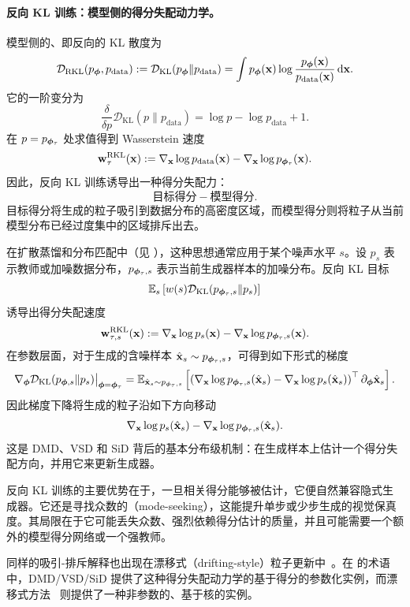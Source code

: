 \paragraph{反向 KL 训练：模型侧的得分失配动力学。}
模型侧的、即反向的 KL 散度为
\[
    \mathcal{D}_{\mathrm{RKL}}(p_{{\bm{\phi}}},p_{\mathrm{data}})
    :=
    \mathcal D_{\mathrm{KL}}(p_{{\bm{\phi}}}\|p_{\mathrm{data}})
    =
    \int
    p_{{\bm{\phi}}}({\mathbf{x}})
    \log
    \frac{p_{{\bm{\phi}}}({\mathbf{x}})}
         {p_{\mathrm{data}}({\mathbf{x}})}
    \mathop{}\!\mathrm{d}{\mathbf{x}}.
\]
它的一阶变分为
\[
    \frac{\delta}{\delta p}
    \mathcal D_{\mathrm{KL}}(p\|p_{\mathrm{data}})
    =
    \log p-\log p_{\mathrm{data}}+1.
\]
在 $p=p_{{\bm{\phi}}_\tau}$ 处求值得到 Wasserstein 速度
\[
    {\mathbf{w}}_\tau^{\mathrm{RKL}}({\mathbf{x}})
    :=
    \nabla_{{\mathbf{x}}}\log p_{\mathrm{data}}({\mathbf{x}})
    -
    \nabla_{{\mathbf{x}}}\log p_{{\bm{\phi}}_\tau}({\mathbf{x}}).
\]
因此，反向 KL 训练诱导出一种得分失配力：
\[
    \text{目标得分}
    -
    \text{模型得分}.
\]
目标得分将生成的粒子吸引到数据分布的高密度区域，而模型得分则将粒子从当前模型分布已经过度集中的区域排斥出去。

在扩散蒸馏和分布匹配中（见 ），这种思想通常应用于某个噪声水平 $s$。设 $p_s$ 表示教师或加噪数据分布，$p_{{\bm{\phi}}_\tau,s}$ 表示当前生成器样本的加噪分布。反向 KL 目标
\[
    \mathbb{E}_s
    \left[
        w(s)
        \mathcal D_{\mathrm{KL}}(p_{{\bm{\phi}}_\tau,s}\|p_s)
    \right]
\]
诱导出得分失配速度
\[
    {\mathbf{w}}_{\tau,s}^{\mathrm{RKL}}({\mathbf{x}})
    :=
    \nabla_{{\mathbf{x}}}\log p_s({\mathbf{x}})
    -
    \nabla_{{\mathbf{x}}}\log p_{{\bm{\phi}}_\tau,s}({\mathbf{x}}).
\]
在参数层面，对于生成的含噪样本 $\hat{{\mathbf{x}}}_s\sim p_{{\bm{\phi}}_\tau,s}$，可得到如下形式的梯度
\[
    \nabla_{{\bm{\phi}}}
    \mathcal D_{\mathrm{KL}}(p_{{\bm{\phi}},s}\|p_s)
    \big|_{{\bm{\phi}}={\bm{\phi}}_\tau}
    =
    \mathbb{E}_{\hat{{\mathbf{x}}}_s\sim p_{{\bm{\phi}}_\tau,s}}
    \left[
        \left(
            \nabla_{{\mathbf{x}}}\log p_{{\bm{\phi}}_\tau,s}(\hat{{\mathbf{x}}}_s)
            -
            \nabla_{{\mathbf{x}}}\log p_s(\hat{{\mathbf{x}}}_s)
        \right)^\top
        \partial_{{\bm{\phi}}}\hat{{\mathbf{x}}}_s
    \right].
\]
因此梯度下降将生成的粒子沿如下方向移动
\[
    \nabla_{{\mathbf{x}}}\log p_s(\hat{{\mathbf{x}}}_s)
    -
    \nabla_{{\mathbf{x}}}\log p_{{\bm{\phi}}_\tau,s}(\hat{{\mathbf{x}}}_s).
\]
这是 DMD、VSD 和 SiD 背后的基本分布级机制：在生成样本上估计一个得分失配方向，并用它来更新生成器。

反向 KL 训练的主要优势在于，一旦相关得分能够被估计，它便自然兼容隐式生成器。它还是寻找众数的（mode-seeking），这能提升单步或少步生成的视觉保真度。其局限在于它可能丢失众数、强烈依赖得分估计的质量，并且可能需要一个额外的模型得分网络或一个强教师。

同样的吸引-排斥解释也出现在漂移式（drifting-style）粒子更新中~\citep{weber2023the,deng2026generative}。在 \citet{lai2026unified} 的术语中，DMD/VSD/SiD 提供了这种得分失配动力学的基于得分的参数化实例，而漂移式方法~\citep{weber2023the,deng2026generative} 则提供了一种非参数的、基于核的实例。



